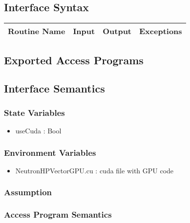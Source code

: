 \documentclass[12pt]{article}
\begin{document}
\subsection{Interface Syntax}%
\begin{tabular}{| p{4cm} | p{4cm} | p{4cm} |  p{4cm} |}
\hline
Routine Name & Input & Output & Exceptions \\ \hline
\end{tabular}
\subsection{Exported Access Programs}%

\subsection{Interface Semantics}

\subsubsection{State Variables}%
\begin{itemize}
\item useCuda : Bool
\end{itemize}

\subsubsection{Environment Variables}%
\begin{itemize}
\item NeutronHPVectorGPU.cu : cuda file with GPU code
\end{itemize}


\subsubsection{Assumption}%

\subsubsection{Access Program Semantics}%
\end{document}
